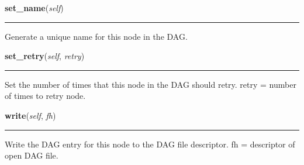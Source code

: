     \label{pipeline:CondorDAGNode:set_name}
    \vspace{0.5ex}

    \noindent\begin{boxedminipage}{\textwidth}

    \raggedright \textbf{set\_name}(\textit{self})

    \vspace{-1.5ex}

    \rule{\textwidth}{0.5\fboxrule}
    Generate a unique name for this node in the DAG.

    \vspace{1ex}

    \end{boxedminipage}

    \label{pipeline:CondorDAGNode:set_retry}
    \vspace{0.5ex}

    \noindent\begin{boxedminipage}{\textwidth}

    \raggedright \textbf{set\_retry}(\textit{self}, \textit{retry})

    \vspace{-1.5ex}

    \rule{\textwidth}{0.5\fboxrule}
    Set the number of times that this node in the DAG should retry. retry 
    = number of times to retry node.

    \vspace{1ex}

    \end{boxedminipage}

    \label{pipeline:CondorDAGNode:write}
    \vspace{0.5ex}

    \noindent\begin{boxedminipage}{\textwidth}

    \raggedright \textbf{write}(\textit{self}, \textit{fh})

    \vspace{-1.5ex}

    \rule{\textwidth}{0.5\fboxrule}
    Write the DAG entry for this node to the DAG file descriptor. fh = 
    descriptor of open DAG file.

    \vspace{1ex}

    \end{boxedminipage}

